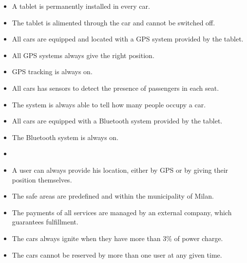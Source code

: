\documentclass{article}
\begin{document}
			\begin{itemize}
				\item A tablet is permanently installed in every car.
				\item The tablet is alimented through the car and cannot be switched off.
				\item All cars are equipped and located with a GPS system provided by the tablet.
				\item All GPS systems always give the right position.
				\item GPS tracking is always on.
				\item All cars has sensors to detect the presence of passengers in each seat.
				\item The system is always able to tell how many people occupy a car.
				\item All cars are equipped with a Bluetooth system provided by the tablet.
				\item The Bluetooth system is always on.
				\item %
				\item A user can always provide his location, either by GPS or by giving their position themselves.
				\item The safe areas are predefined and within the municipality of Milan.
				\item The payments of all services are managed by an external company, which guarantees fulfillment.
				\item The cars always ignite when they have more than 3\% of power charge. %
				\item The cars cannot be reserved by more than one user at any given time. %
			\end{itemize}
\end{document}
